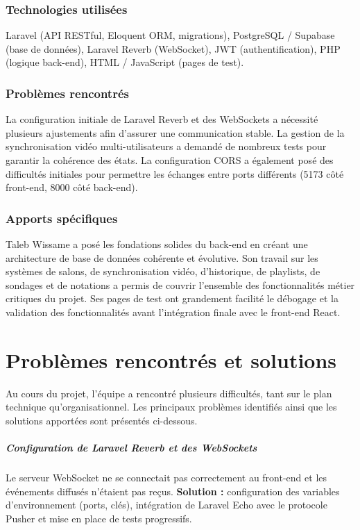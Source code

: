 \documentclass[12pt,a4paper]{report}
\begin{document}
\subsection*{Technologies utilisées}

Laravel (API RESTful, Eloquent ORM, migrations), PostgreSQL / Supabase (base de données), Laravel Reverb (WebSocket), JWT (authentification), PHP (logique back-end), HTML / JavaScript (pages de test).

\subsection*{Problèmes rencontrés}

La configuration initiale de Laravel Reverb et des WebSockets a nécessité plusieurs ajustements afin d'assurer une communication stable. La gestion de la synchronisation vidéo multi-utilisateurs a demandé de nombreux tests pour garantir la cohérence des états. La configuration CORS a également posé des difficultés initiales pour permettre les échanges entre ports différents (5173 côté front-end, 8000 côté back-end).

\subsection*{Apports spécifiques}

Taleb Wissame a posé les fondations solides du back-end en créant une architecture de base de données cohérente et évolutive. Son travail sur les systèmes de salons, de synchronisation vidéo, d'historique, de playlists, de sondages et de notations a permis de couvrir l'ensemble des fonctionnalités métier critiques du projet. Ses pages de test ont grandement facilité le débogage et la validation des fonctionnalités avant l'intégration finale avec le front-end React.
\chapter{Problèmes rencontrés et solutions}

Au cours du projet, l’équipe a rencontré plusieurs difficultés, tant sur le plan technique qu’organisationnel. Les principaux problèmes identifiés ainsi que les solutions apportées sont présentés ci-dessous.

\paragraph{Configuration de Laravel Reverb et des WebSockets}
Le serveur WebSocket ne se connectait pas correctement au front-end et les événements diffusés n’étaient pas reçus.  
\textbf{Solution :} configuration des variables d’environnement (ports, clés), intégration de Laravel Echo avec le protocole Pusher et mise en place de tests progressifs.
\end{document}
